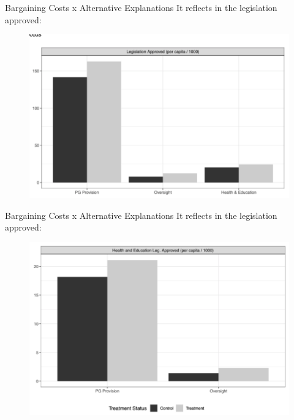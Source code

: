 \documentclass[11pt]{beamer}
\begin{document}
\begin{frame}{Bargaining Costs x Alternative Explanations}
It reflects in the legislation approved:
  \begin{figure}[htb]
   \centering
   \includegraphics[width=1\textwidth]{fig3.png}
  \end{figure}
\end{frame}

\begin{frame}{Bargaining Costs x Alternative Explanations}
It reflects in the legislation approved:
  \begin{figure}[htb]
   \centering
   \includegraphics[width=1\textwidth]{fig4.png}
  \end{figure}
\end{frame}
\end{document}

